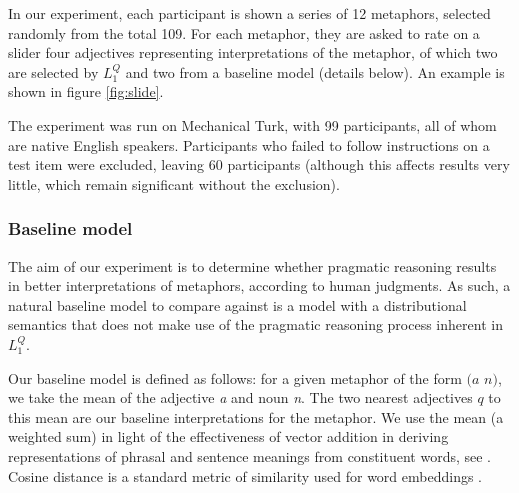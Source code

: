 \documentclass[OpenMind]{stjour}
\newcommand{\Listener}{L}
\newcommand{\QLONE}{\Listener_{{1}}^{{Q}}}
\begin{document}
		In our experiment, each participant is shown a series of 12 metaphors, selected randomly from the total 109. For each metaphor, they are asked to rate on a slider four adjectives representing interpretations of the metaphor, of which two are selected by $\QLONE$ and two from a baseline model (details below). An example is shown in figure \ref{fig:slide}.

		The experiment was run on Mechanical Turk, with 99 participants, all of whom are native English speakers. Participants who failed to follow instructions on a test item were excluded, leaving 60 participants (although this affects results very little, which remain significant without the exclusion).
	
	\subsubsection{Baseline model}




		The aim of our experiment is to determine whether pragmatic reasoning results in better interpretations of metaphors, according to human judgments. As such, a natural baseline model to compare against is a model with a distributional semantics that does not make use of the pragmatic reasoning process inherent in $\QLONE$.

		Our baseline model is defined as follows: for a given metaphor of the form $(a$ $n)$, we take the mean of the adjective \emph{a} and noun \emph{n}. The two nearest adjectives $q$ to this mean are our baseline interpretations for the metaphor. We use the mean (a weighted sum) in light of the effectiveness of vector addition in deriving representations of phrasal and sentence meanings from constituent words, see \citep{mitchell2010composition,grefenstette2013category,socher2013recursive}. Cosine distance is a standard metric of similarity used for word embeddings \citep{pennington2014glove}.



			


\end{document}
